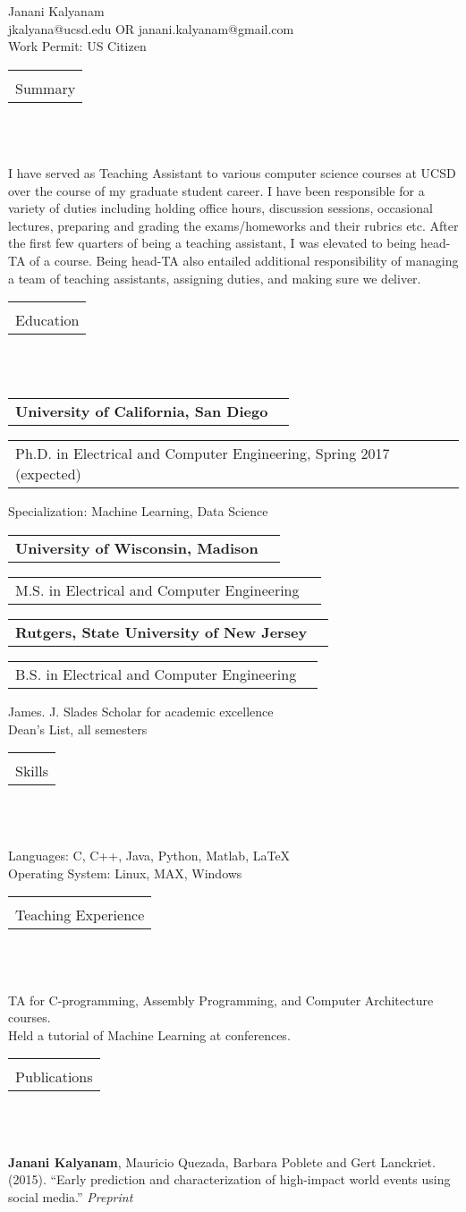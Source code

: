 \documentclass[11pt]{article}
\makeatletter
\newcommand{\bigname}[3]{{\fontsize{#2}{#3}\selectfont #1}}
\newcommand{\ncheader}[9]{
  \newlength{\oldtabcolsep}
  \setlength{\oldtabcolsep}{\tabcolsep}
  \setlength{\tabcolsep}{2.0em}
  \newlength{\oldbigstrutjot}
  \setlength{\oldbigstrutjot}{\bigstrutjot}
  \setlength{\bigstrutjot}{4pt}
  \begin{tabularx}{\textwidth}{@{}X p{#3}@{}}
    \multirow{2}[2]{*}[#4]{\centering\mbox{#1}} &
    \makebox[\linewidth][s]{\fontsize{#8}{#9}\selectfont
      \textrm{\mbox{#5} \mbox{#6}}} \bigstrut[t] \bigstrut[t] \\
    & \makebox[\linewidth][s]{\fontsize{#8}{#9}\selectfont
      \textrm{\mbox{#2} \mbox{#7}}} \bigstrut[t] \bigstrut[t] \\
    &
  \end{tabularx}
  \setlength{\bigstrutjot}{\oldbigstrutjot}
  \setlength{\tabcolsep}{\oldtabcolsep}
  \let\oldtabcolsep\undefined
}
\newcommand{\secheader}[1]{

  {\begin{tabularx}{\textwidth}{@{}X}
    \midrule[0.095em] \\ \addlinespace[-1.2em]
    #1 \\
    \bottomrule[0.02em]
  \end{tabularx}\hfill\\\\}
}
\newcommand{\itemplaceheader}[2]{
  {\begin{tabular*}{\textwidth}{%
        @{\extracolsep{\fill}}%
        @{}l@{}%
        @{}r@{}}
      \textbf{#1} & {#2}
  \end{tabular*}}
}
\newcommand{\itempositionheader}[2]{
  {\setlength{\tabcolsep}{0em}
    \begin{tabular*}{\textwidth}{%
        @{\extracolsep{\fill}}
        @{}l@{}%
        @{}r@{}}
      \textrm{#1} & \textrm{#2}
  \end{tabular*}}
}
\makeatother
\begin{document}

\begin{center}
  \bigname{Janani Kalyanam}{25}{25} \\[0.75em]
  jkalyana@ucsd.edu OR janani.kalyanam@gmail.com \\
    Work Permit:  US Citizen \\
\end{center}

\secheader{Summary}
\small{I have served as Teaching Assistant to various computer science 
courses at UCSD over the course of my graduate student career.  
I have been responsible for a variety of duties including holding
office hours, discussion sessions, occasional lectures, preparing and
grading the exams/homeworks and their rubrics etc.
After the first few quarters of being a teaching assistant, I was elevated to
being head-TA of a course.  Being head-TA also entailed additional responsibility
of managing a team of teaching assistants, assigning duties, and making sure
we deliver.}


\secheader{Education}
\itemplaceheader{University of California, San Diego}{}
\itempositionheader {Ph.D. in Electrical and Computer Engineering, Spring 2017 (expected)} {}
Specialization: Machine Learning, Data Science \\

\itemplaceheader{University of Wisconsin, Madison}{}
\itempositionheader {M.S. in Electrical and Computer Engineering}{} 

\itemplaceheader{Rutgers, State University of New Jersey}{}
\itempositionheader {B.S. in Electrical and Computer Engineering}{}
James. J. Slades Scholar for academic excellence \\
Dean's List, all semesters \\

\secheader{Skills}
Languages: C, C++, Java, Python, Matlab, LaTeX \\ 
Operating System: Linux, MAX, Windows \\

\secheader{Teaching Experience}
TA for C-programming, Assembly Programming, and Computer Architecture courses. \\
Held a tutorial of Machine Learning at conferences.\\

\secheader{Publications}
\textbf{Janani Kalyanam}, Mauricio Quezada, Barbara Poblete and Gert Lanckriet. (2015). 
``Early prediction and characterization of high-impact world events using social media.''
\textit{Preprint} \\
\end{document}

